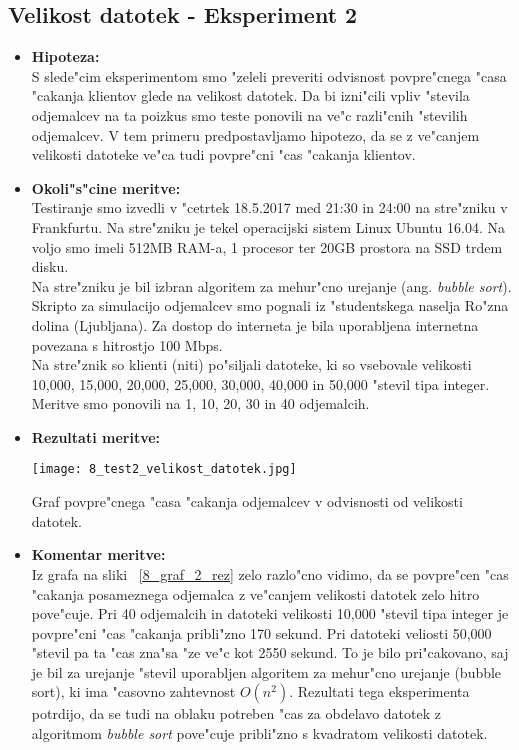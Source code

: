 \subsection{Velikost datotek - Eksperiment 2}
\label{8_subsec:eksperiment_2}
\begin{itemize}
	\item \textbf{Hipoteza: }  \\
		S slede"cim eksperimentom smo "zeleli preveriti odvisnost povpre"cnega "casa "cakanja klientov glede na velikost datotek. Da bi izni"cili vpliv "stevila odjemalcev na ta poizkus smo teste ponovili na ve"c razli"cnih "stevilih odjemalcev. V tem primeru predpostavljamo hipotezo, da se z ve"canjem velikosti datoteke ve"ca tudi povpre"cni "cas "cakanja klientov.

	\item \textbf{Okoli"s"cine meritve: } \\
		Testiranje smo izvedli v "cetrtek 18.5.2017 med 21:30 in 24:00 na stre"zniku v Frankfurtu. Na stre"zniku je tekel operacijski sistem Linux Ubuntu 16.04. Na voljo smo imeli 512MB RAM-a, 1 procesor ter 20GB prostora na SSD trdem disku.\\ Na stre"zniku je bil izbran algoritem za mehur"cno urejanje (ang. \textit{bubble sort}). Skripto za simulacijo odjemalcev smo pognali iz "studentskega naselja Ro"zna dolina (Ljubljana). Za dostop do interneta je bila uporabljena internetna povezana s hitrostjo 100 Mbps.\\ Na stre"znik so klienti (niti) po"siljali datoteke, ki so vsebovale velikosti 10,000, 15,000, 20,000, 25,000, 30,000, 40,000 in 50,000 "stevil tipa integer. Meritve smo ponovili na 1, 10, 20, 30 in 40 odjemalcih.

 	\item \textbf{Rezultati meritve: }  \\

    \begin{table}[!h]
      \centering
        \texttt{[image: 8\_test2\_velikost\_datotek.jpg]}
      \caption{Graf povpre"cnega "casa "cakanja odjemalcev v odvisnosti od velikosti datotek.}
      \label{8_graf_2_rez}
    \end{table}

    \pagebreak
	\item \textbf{Komentar meritve: } \\
		Iz grafa na sliki ~\ref{8_graf_2_rez} zelo razlo"cno vidimo, da se povpre"cen "cas "cakanja posameznega odjemalca z ve"canjem velikosti datotek zelo hitro pove"cuje. Pri 40 odjemalcih in datoteki velikosti 10,000 "stevil tipa integer je povpre"cni "cas "cakanja pribli"zno 170 sekund. Pri datoteki veliosti 50,000 "stevil pa ta "cas zna"sa "ze ve"c kot 2550 sekund. To je bilo pri"cakovano, saj je bil za urejanje "stevil uporabljen algoritem za mehur"cno urejanje (bubble sort), ki ima "casovno zahtevnost $O(n^2)$. Rezultati tega eksperimenta potrdijo, da se tudi na oblaku potreben "cas za obdelavo datotek z algoritmom \textit{bubble sort} pove"cuje pribli"zno s kvadratom velikosti datotek.
\end{itemize}

